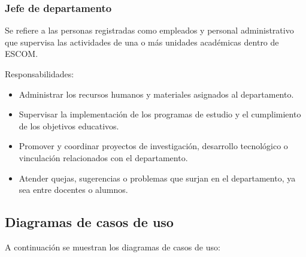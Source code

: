 \begin{Usuario}{\hypertarget{tJefe}{\subsubsection{Jefe de departamento}}}{
	Se refiere a las personas registradas como empleados y personal administrativo que supervisa las actividades de una o más unidades académicas dentro de ESCOM.
}
\item[Responsabilidades:] \cdtEmpty
\begin{itemize}

	\item Administrar los recursos humanos y materiales asignados al departamento.
	\item Supervisar la implementación de los programas de estudio y el cumplimiento de los objetivos educativos.
	\item Promover y coordinar proyectos de investigación, desarrollo tecnológico o vinculación relacionados con el departamento.
	\item Atender quejas, sugerencias o problemas que surjan en el departamento, ya sea entre docentes o alumnos.
\end{itemize}

\end{Usuario}

\newpage

\subsection{Diagramas de casos de uso}

A continuación se muestran los diagramas de casos de uso:


